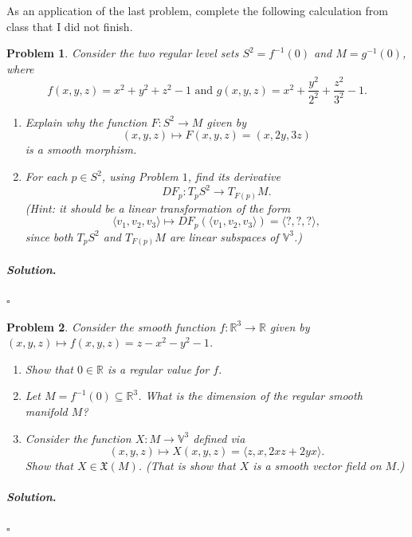 \documentclass[reqno]{amsart}
\theoremstyle{plain}
\newtheorem{problem}{Problem}
\theoremstyle{definition}
\newenvironment{solution}{\paragraph{\emph{Solution}.}}{\hfill$\square$}
\begin{document}
As an application of the last problem, complete the following calculation from class that I did not finish.
\begin{problem}
Consider the two regular level sets $S^{2} = f^{-1}(0)$ and $M = g^{-1}(0)$, where 
$$f(x,y,z) = x^{2} + y^{2} + z^{2} - 1 \text{ and } g(x,y,z) = x^{2} + \frac{y^{2}}{2^{2}} + \frac{z^{2}}{3^{2}} - 1.$$
\begin{enumerate}
\item Explain why the function $F:S^{2} \rightarrow M$ given by
$$(x,y,z) \mapsto F(x,y,z) = (x,2y,3z) $$
is a smooth morphism.
\item For each $p \in S^{2}$, using Problem $1$, find its derivative
$$DF_{p}: T_{p}S^{2} \rightarrow T_{F(p)} M. $$
(Hint:  it should be a linear transformation of the form 
$$\langle v_{1},v_{2}, v_{3} \rangle \mapsto DF_{p} ( \langle v_{1},v_{2},v_{3}\rangle ) = \langle ?,?,?\rangle,$$
since both $T_{p}S^{2}$ and $T_{F(p)}M$ are linear subspaces of $\mathbb{V}^{3}$.)
\end{enumerate}
\end{problem}
\begin{solution}

\end{solution}

\begin{problem}
Consider the smooth function $f:\mathbb{R}^{3} \rightarrow \mathbb{R}$ given by $(x,y,z) \mapsto f(x,y,z) = z - x^{2} - y^{2} -1$.
\begin{enumerate}
\item Show that $0 \in \mathbb{R}$ is a regular value for $f$.
\item Let $M = f^{-1}(0) \subseteq \mathbb{R}^{3}$.  What is the dimension of the regular smooth manifold $M$?
\item Consider the function $X: M \rightarrow \mathbb{V}^{3}$ defined via
$$(x,y,z) \mapsto X(x,y,z) = \langle z, x, 2xz + 2yx \rangle. $$
Show that $X \in \mathfrak{X}(M)$.  (That is show that $X$ is a smooth vector field on $M$.)
\end{enumerate}
\end{problem}
\begin{solution}

\end{solution}
\end{document}
